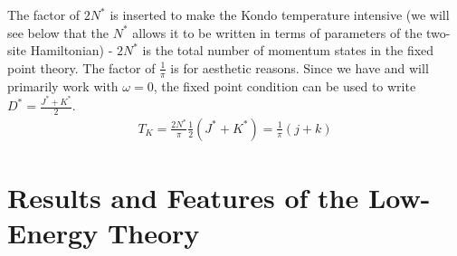 \documentclass[twoside,11pt]{report}
\numberwithin{equation}{section}
\begin{document}
The factor of \(2N^*\) is inserted to make the Kondo temperature intensive (we will see below that the \(N^*\) allows it to  be written in terms of parameters of the two-site Hamiltonian) - \(2N^*\) is the total number of momentum states in the fixed point theory. The factor of \(\frac{1}{\pi}\) is for aesthetic reasons. Since we have and will primarily work with \(\omega=0\), the fixed point condition can be used to write \(D^* = \frac{J^* + K^*}{2}\).
\begin{equation}\begin{aligned}
	T_K = \frac{2N^*}{\pi}\frac{1}{2}\left(J^* + K^*\right) = \frac{1}{\pi}\left(j + k\right)
\end{aligned}\end{equation}

\chapter{Results and Features of the Low-Energy Theory}
\label{results}
\end{document}
